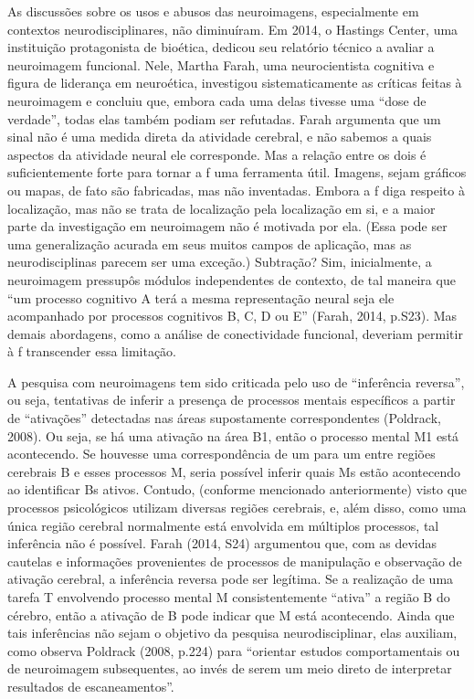 As discussões sobre os usos e abusos das neuroimagens, especialmente em
contextos neurodisciplinares, não diminuíram. Em 2014, o Hastings
Center, uma instituição protagonista de bioética, dedicou seu relatório
técnico a avaliar a neuroimagem funcional. Nele, Martha Farah, uma
neurocientista cognitiva e figura de liderança em neuroética, investigou
sistematicamente as críticas feitas à neuroimagem e concluiu que, embora
cada uma delas tivesse uma ``dose de verdade'', todas elas também podiam
ser refutadas. Farah argumenta que um sinal  não é uma medida direta
da atividade cerebral, e não sabemos a quais aspectos da atividade
neural ele corresponde. Mas a relação entre os dois é suficientemente
forte para tornar a f uma ferramenta útil. Imagens, sejam gráficos ou
mapas, de fato são fabricadas, mas não inventadas. Embora a f diga
respeito à localização, mas não se trata de localização pela localização
em si, e a maior parte da investigação em neuroimagem não é motivada por
ela. (Essa pode ser uma generalização acurada em seus muitos campos de
aplicação, mas as neurodisciplinas parecem ser uma exceção.) Subtração?
Sim, inicialmente, a neuroimagem pressupôs módulos independentes de
contexto, de tal maneira que ``um processo cognitivo A terá a mesma
representação neural seja ele acompanhado por processos cognitivos B, C,
D ou E'' (Farah, 2014, p.S23). Mas demais abordagens, como a análise de
conectividade funcional, deveriam permitir à f transcender essa
limitação.

A pesquisa com neuroimagens tem sido criticada pelo uso de ``inferência
reversa'', ou seja, tentativas de inferir a presença de processos
mentais específicos a partir de ``ativações'' detectadas nas áreas
supostamente correspondentes (Poldrack, 2008). Ou seja, se há uma
ativação na área B1, então o processo mental M1 está acontecendo. Se
houvesse uma correspondência de um para um entre regiões cerebrais B e
esses processos M, seria possível inferir quais Ms estão acontecendo ao
identificar Bs ativos. Contudo, (conforme mencionado anteriormente)
visto que processos psicológicos utilizam diversas regiões cerebrais, e,
além disso, como uma única região cerebral normalmente está envolvida em
múltiplos processos, tal inferência não é possível. Farah (2014, S24)
argumentou que, com as devidas cautelas e informações provenientes de
processos de manipulação e observação de ativação cerebral, a inferência
reversa pode ser legítima. Se a realização de uma tarefa T envolvendo
processo mental M consistentemente ``ativa'' a região B do cérebro,
então a ativação de B pode indicar que M está acontecendo. Ainda que
tais inferências não sejam o objetivo da pesquisa neurodisciplinar, elas
auxiliam, como observa Poldrack (2008, p.224) para ``orientar estudos
comportamentais ou de neuroimagem subsequentes, ao invés de serem um
meio direto de interpretar resultados de escaneamentos''.

